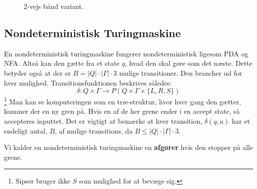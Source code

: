 \begin{figure}[ht]
	\centering
	\caption{\label{fig:2vejsbånd} 2-vejs bånd variant.}
\end{figure}


\subsection{Nondeterministisk Turingmaskine}%
\label{subsec:nondeterministicturingmachine}

En nondeterministisk turingmaskine fungerer nondeterministisk ligesom PDA og NFA. Altså kan den gætte fra et state $q$, hvad den skal gøre som det næste. Dette betyder også at der er $B = |Q| \cdot |\Gamma| \cdot 3$ mulige transitioner.
Den brancher ud for hver mulighed. Transitionsfunktionen beskrives således:
\[ \delta : Q \times \Gamma \longrightarrow P(Q \times \Gamma \times \{L, R, S\})\]\footnote{Sipser bruger ikke $S$ som mulighed for at bevæge sig.}
Man kan se komputeringen som en træ-struktur, hvor hver gang den gætter, kommer der en ny gren på. Hvis en af de her grene ender i en accept state, så accepteres inputtet. Det er vigtigt at bemærke at hver transition, $\delta(q,a)$ har et endeligt antal, $B$, af mulige transitions, da $B \le |Q| \cdot |\Gamma| \cdot 3$.

Vi kalder en nondeterministisk turingmaskine en \textbf{afgører} hvis den stopper på alle grene.

